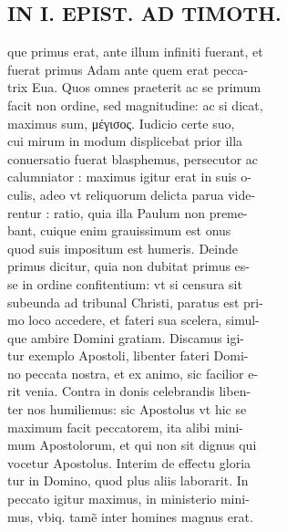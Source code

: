 \documentclass{article}
\begin{document}
\begin{pages}
\section*{IN I. EPIST. AD TIMOTH. \\
                }
que primus erat, ante illum infiniti fuerant, et \\
                fuerat primus Adam ante quem erat pecca- \\
                trix Eua. Quos omnes praeterit ac se primum \\
                facit non ordine, sed magnitudine: ac si dicat, \\
                maximus sum, μέγισος. Iudicio certe suo, \\
                cui mirum in modum displicebat prior illa \\
                conuersatio fuerat blasphemus, persecutor ac \\
                calumniator : maximus igitur erat in suis o- \\
                culis, adeo vt reliquorum delicta parua vide- \\
                rentur : ratio, quia illa Paulum non preme- \\
                bant, cuique enim grauissimum est onus \\
                quod suis impositum est humeris. Deinde \\
                primus dicitur, quia non dubitat primus es- \\
                se in ordine confitentium: vt si censura sit \\
                subeunda ad tribunal Christi, paratus est pri- \\
                mo loco accedere, et fateri sua scelera, simul- \\
                que ambire Domini gratiam. Discamus igi- \\
                tur exemplo Apostoli, libenter fateri Domi- \\
                no peccata nostra, et ex animo, sic facilior e- \\
                rit venia. Contra in donis celebrandis liben- \\
                ter nos humiliemus: sic Apostolus vt hic se \\
                maximum facit peccatorem, ita alibi mini- \\
                mum Apostolorum, et qui non sit dignus qui \\
                vocetur Apostolus. Interim de effectu gloria \\
                tur in Domino, quod plus aliis laborarit. In \\
                peccato igitur maximus, in ministerio mini- \\
                mus, vbiq. tamẽ inter homines magnus erat. \\
                

\end{pages}
\end{document}
